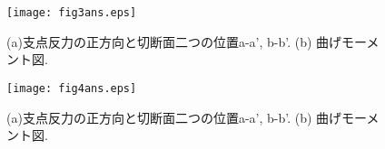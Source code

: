 ﻿\documentclass[10pt,a4j]{jarticle}
\begin{document}
\begin{figure}[h]
	\begin{center}
	\texttt{[image: fig3ans.eps]} 
	\end{center}
	\caption{
		(a)支点反力の正方向と切断面二つの位置a-a', b-b'. 
		(b) 曲げモーメント図.} 
	\label{fig:fig3}
\end{figure}
\begin{figure}[h]
	\begin{center}
	\texttt{[image: fig4ans.eps]} 
	\end{center}
	\caption{
		(a)支点反力の正方向と切断面二つの位置a-a', b-b'. 
		(b) 曲げモーメント図.} 
	\label{fig:fig4}
\end{figure}
\end{document}
